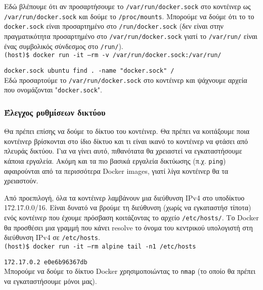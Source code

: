 Εδώ βλέπουμε ότι αν προσαρτήσουμε το \texttt{\textlatin{/var/run/docker.sock}}
στο κοντέινερ ως \texttt{\textlatin{/var/run/docker.sock}} και δούμε το
\texttt{\textlatin{/proc/mounts}}. Μπορούμε να δούμε ότι το το
\texttt{\textlatin{docker.sock}} είναι προσαρτημένο στο
\texttt{\textlatin{/run/docker.sock}} (δεν είναι στην πραγματικότητα
προσαρτημένο στο \texttt{\textlatin{/var/run/docker.sock}} γιατί το
\texttt{\textlatin{/var/run/}} είναι ένας συμβολικός σύνδεσμος στο
\texttt{\textlatin{/run/}}). \\

\texttt{\textlatin{(host)\$ docker run -it --rm -v /var/run/docker.sock:/var/run/}}

\texttt{\textlatin{docker.sock ubuntu find . -name "docker.sock" /}} \\

Εδώ προσαρτούμε το \texttt{\textlatin{/var/run/docker.sock}} στο κοντέινερ και
ψάχνουμε αρχεία που ονομάζονται "\texttt{\textlatin{docker.sock}}".

\subsubsection{Έλεγχος ρυθμίσεων δικτύου}

Θα πρέπει επίσης να δούμε το δίκτυο του κοντέινερ. Θα πρέπει να κοιτάξουμε
ποια κοντέινερ βρίσκονται στο ίδιο δίκτυο και τι είναι ικανό το κοντέινερ
να φτάσει από πλευράς δικτύου. Για να γίνει αυτό, πιθανότατα θα χρειαστεί να
εγκαταστήσουμε κάποια εργαλεία. Ακόμη και τα πιο βασικά εργαλεία δικτύωσης
(π.χ. \texttt{\textlatin{ping}}) αφαιρούνται από τα περισσότερα
\textlatin{Docker images}, γιατί λίγα κοντέινερ θα τα χρειαστούν.


Από προεπιλογή, όλα τα κοντέινερ λαμβάνουν μια διεύθυνση \textlatin{IPv4} στο
υποδίκτυο 172.17.0.0/16. Είναι δυνατό να βρούμε τη διεύθυνση (χωρίς να
εγκαταστήσ τίποτα) ενός κοντέινερ που έχουμε πρόσβαση κοιτάζοντας το αρχείο
\texttt{\textlatin{/etc/hosts/}}. Το \textlatin{Docker} θα προσθέσει μια γραμμή
που κάνει \textlatin{resolve} το όνομα του κεντρικού υπολογιστή στη διεύθυνση
\textlatin{IPv4} σε \texttt{\textlatin{/etc/hosts}}. \\

\texttt{\textlatin{(host)\$ docker run -it --rm alpine tail -n1 /etc/hosts}}

\texttt{\textlatin{172.17.0.2 e0e6b96367db}} \\

Μπορούμε να δούμε το δίκτυο \textlatin{Docker} χρησιμοποιώντας το
\texttt{\textlatin{nmap}} (το οποίο θα πρέπει να εγκαταστήσουμε μόνοι μας). \\

